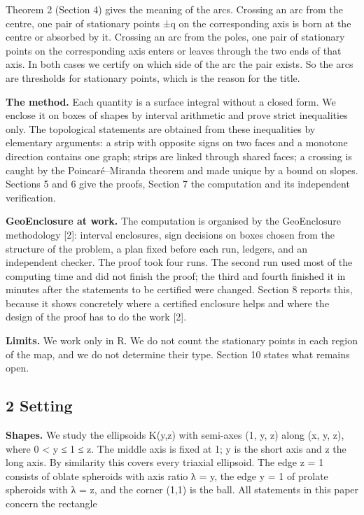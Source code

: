 \documentclass[
  11pt,
]{article}
\begin{document}
Theorem 2 (Section 4) gives the meaning of the arcs. Crossing an arc
from the centre, one pair of stationary points ±q on the corresponding
axis is born at the centre or absorbed by it. Crossing an arc from the
poles, one pair of stationary points on the corresponding axis enters or
leaves through the two ends of that axis. In both cases we certify on
which side of the arc the pair exists. So the arcs are thresholds for
stationary points, which is the reason for the title.

\textbf{The method.} Each quantity is a surface integral without a
closed form. We enclose it on boxes of shapes by interval arithmetic and
prove strict inequalities only. The topological statements are obtained
from these inequalities by elementary arguments: a strip with opposite
signs on two faces and a monotone direction contains one graph; strips
are linked through shared faces; a crossing is caught by the
Poincaré--Miranda theorem and made unique by a bound on slopes. Sections
5 and 6 give the proofs, Section 7 the computation and its independent
verification.

\textbf{GeoEnclosure at work.} The computation is organised by the
GeoEnclosure methodology {[}2{]}: interval enclosures, sign decisions on
boxes chosen from the structure of the problem, a plan fixed before each
run, ledgers, and an independent checker. The proof took four runs. The
second run used most of the computing time and did not finish the proof;
the third and fourth finished it in minutes after the statements to be
certified were changed. Section 8 reports this, because it shows
concretely where a certified enclosure helps and where the design of the
proof has to do the work {[}2{]}.

\textbf{Limits.} We work only in R. We do not count the stationary
points in each region of the map, and we do not determine their type.
Section 10 states what remains open.

\subsection{2 Setting}

\textbf{Shapes.} We study the ellipsoids K(y,z) with semi-axes (1, y, z)
along (x, y, z), where 0 \textless{} y ≤ 1 ≤ z. The middle axis is fixed
at 1; y is the short axis and z the long axis. By similarity this covers
every triaxial ellipsoid. The edge z = 1 consists of oblate spheroids
with axis ratio λ = y, the edge y = 1 of prolate spheroids with λ = z,
and the corner (1,1) is the ball. All statements in this paper concern
the rectangle
\end{document}
